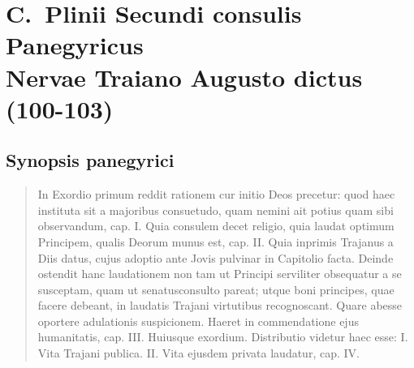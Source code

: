 
\section*{C.\ Plinii Secundi consulis Panegyricus \\Nervae Traiano Augusto dictus (100-103)}


\subsection*{Synopsis panegyrici}
\begin{quotation}
{\noindent
In Exordio primum reddit rationem cur initio Deos precetur: quod haec instituta sit a majoribus consuetudo, quam nemini ait potius quam sibi observandum, cap. I. Quia consulem decet religio, quia laudat optimum Principem, qualis Deorum munus est, cap. II. Quia inprimis Trajanus a Diis datus, cujus adoptio ante Jovis pulvinar in Capitolio facta. Deinde ostendit hanc laudationem non tam ut Principi serviliter obsequatur a se susceptam, quam ut senatusconsulto pareat; utque boni principes, quae facere debeant, in laudatis Trajani virtutibus recognoscant. Quare abesse oportere adulationis suspicionem. Haeret in commendatione ejus humanitatis, cap. III. Huiusque exordium. Distributio videtur haec esse: I. Vita Trajani publica. II. Vita ejusdem privata laudatur, cap. IV. 

}
\end{quotation}
